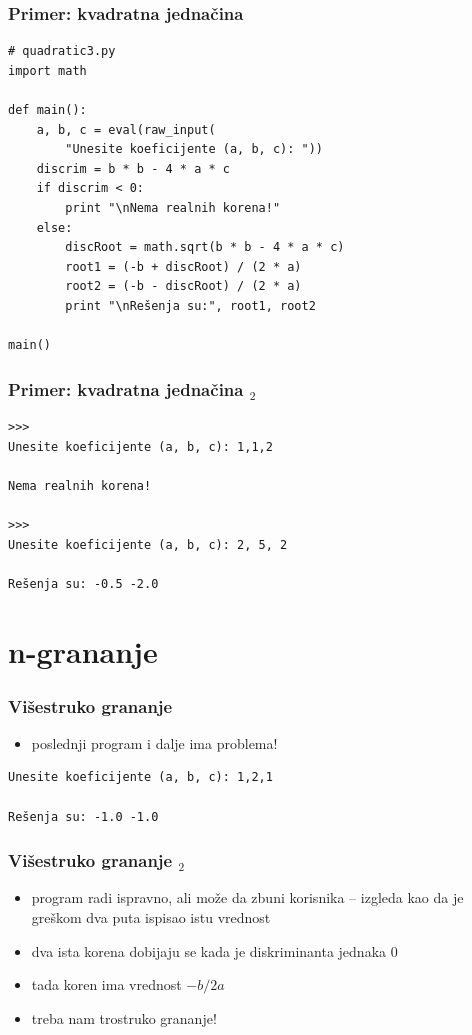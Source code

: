 \documentclass[utf8,compress]{beamer}
\begin{document}
\begin{frame}[fragile,shrink=5]
  \frametitle{Primer: kvadratna jednačina}
\begin{verbatim}
# quadratic3.py
import math 

def main():
    a, b, c = eval(raw_input(
        "Unesite koeficijente (a, b, c): "))
    discrim = b * b - 4 * a * c
    if discrim < 0:
        print "\nNema realnih korena!"
    else:
        discRoot = math.sqrt(b * b - 4 * a * c)
        root1 = (-b + discRoot) / (2 * a)
        root2 = (-b - discRoot) / (2 * a)
        print "\nRešenja su:", root1, root2

main()
\end{verbatim}
\end{frame}

\begin{frame}[fragile]
  \frametitle{Primer: kvadratna jednačina $_2$}
\begin{verbatim}
>>> 
Unesite koeficijente (a, b, c): 1,1,2

Nema realnih korena!

>>> 
Unesite koeficijente (a, b, c): 2, 5, 2

Rešenja su: -0.5 -2.0
\end{verbatim}
\end{frame}

\section{n-grananje}

\begin{frame}[fragile]
  \frametitle{Višestruko grananje}
  \begin{itemize}
    \item poslednji program i dalje ima problema!
  \end{itemize}
\begin{verbatim}
Unesite koeficijente (a, b, c): 1,2,1

Rešenja su: -1.0 -1.0
\end{verbatim}
\end{frame}

\begin{frame}[fragile]
  \frametitle{Višestruko grananje $_2$}
  \begin{itemize}
    \item program radi ispravno, ali može da zbuni korisnika -- izgleda kao da je greškom dva puta ispisao istu vrednost
    \item dva ista korena dobijaju se kada je diskriminanta jednaka 0
    \item tada koren ima vrednost $-b/2a$
    \item treba nam trostruko grananje!
  \end{itemize}
\end{frame}
\end{document}
